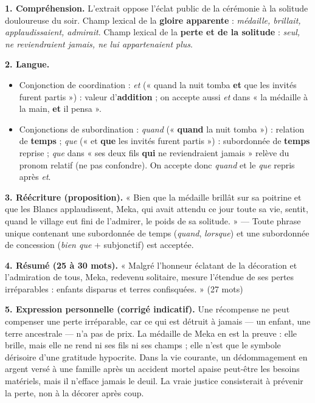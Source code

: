 \documentclass[11pt]{article}
\begin{document}
\begin{corrige}
\textbf{1. Compréhension.} L'extrait oppose l'éclat public de la cérémonie à la solitude douloureuse du soir. Champ lexical de la \textbf{gloire apparente} : \emph{médaille, brillait, applaudissaient, admirait}. Champ lexical de la \textbf{perte et de la solitude} : \emph{seul, ne reviendraient jamais, ne lui appartenaient plus}.

\textbf{2. Langue.}
\begin{itemize}
\item[(a)] Conjonction de coordination : \emph{et} (« quand la nuit tomba \textbf{et} que les invités furent partis ») : valeur d'\textbf{addition} ; on accepte aussi \emph{et} dans « la médaille à la main, \textbf{et} il pensa ».
\item[(b)] Conjonctions de subordination : \emph{quand} (« \textbf{quand} la nuit tomba ») : relation de \textbf{temps} ; \emph{que} (« et \textbf{que} les invités furent partis ») : subordonnée de \textbf{temps} reprise ; \emph{que} dans « ses deux fils \textbf{qui} ne reviendraient jamais » relève du pronom relatif (ne pas confondre). On accepte donc \emph{quand} et le \emph{que} repris après \emph{et}.
\end{itemize}

\textbf{3. Réécriture (proposition).} « Bien que la médaille brillât sur sa poitrine et que les Blancs applaudissent, Meka, qui avait attendu ce jour toute sa vie, sentit, quand le village eut fini de l'admirer, le poids de sa solitude. » — Toute phrase unique contenant une subordonnée de temps (\emph{quand}, \emph{lorsque}) et une subordonnée de concession (\emph{bien que} + subjonctif) est acceptée.

\textbf{4. Résumé (25 à 30 mots).} « Malgré l'honneur éclatant de la décoration et l'admiration de tous, Meka, redevenu solitaire, mesure l'étendue de ses pertes irréparables : enfants disparus et terres confisquées. » (27 mots)

\textbf{5. Expression personnelle (corrigé indicatif).} Une récompense ne peut compenser une perte irréparable, car ce qui est détruit à jamais — un enfant, une terre ancestrale — n'a pas de prix. La médaille de Meka en est la preuve : elle brille, mais elle ne rend ni ses fils ni ses champs ; elle n'est que le symbole dérisoire d'une gratitude hypocrite. Dans la vie courante, un dédommagement en argent versé à une famille après un accident mortel apaise peut-être les besoins matériels, mais il n'efface jamais le deuil. La vraie justice consisterait à prévenir la perte, non à la décorer après coup.


\end{corrige}
\end{document}

